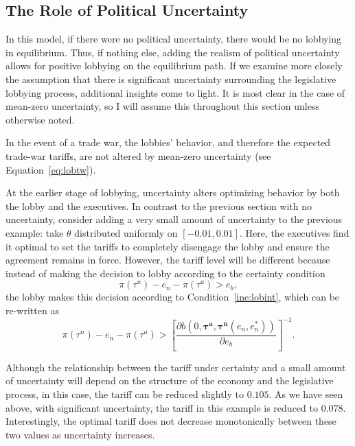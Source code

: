 \documentclass[10pt]{article}
\newcommand{\ve}{\theta}
\newcommand{\bta}{\bm{\tau^a}}
\newcommand{\btn}{\bm{\tau^n}}
\begin{document}
\subsection{The Role of Political Uncertainty}
\label{sec:uncertainty}
In this model, if there were no political uncertainty, there would be no lobbying in equilibrium. Thus, if nothing else, adding the realism of political uncertainty allows for positive lobbying on the equilibrium path. If we examine more closely the assumption that there is significant uncertainty surrounding the legislative lobbying process, additional insights come to light. It is most clear in the case of mean-zero uncertainty, so I will assume this throughout this section unless otherwise noted.

In the event of a trade war, the lobbies' behavior, and therefore the expected trade-war tariffs, are not altered by mean-zero uncertainty (see Equation~\ref{eq:lobtw}).

At the earlier stage of lobbying, uncertainty alters optimizing behavior by both the lobby and the executives. In contrast to the previous section with no uncertainty, consider adding a very small amount of uncertainty to the previous example: take $\ve$ distributed uniformly on $[-0.01,0.01]$. Here, the executives find it optimal to set the tariffs to completely disengage the lobby and ensure the agreement remains in force. However, the tariff level will be different because instead of making the decision to lobby according to the certainty condition
\[\pi(\tau^n) - e_n - \pi(\tau^a) > e_b,
\]
the lobby makes this decision according to Condition~\ref{ine:lobint}, which can be re-written as
\[
\pi(\tau^n) - e_n - \pi(\tau^a) > \left[\frac{\partial b(0,\bta,\btn(e_n,e_n^*))}{\partial e_b}\right]^{-1}.
\]

Although the relationship between the tariff under certainty and a small amount of uncertainty will depend on the structure of the economy and the legislative process, in this case, the tariff can be reduced slightly to $0.105$. As we have seen above, with significant uncertainty, the tariff in this example is reduced to $0.078$. Interestingly, the optimal tariff does not decrease monotonically between these two values as uncertainty increases.
\end{document}
